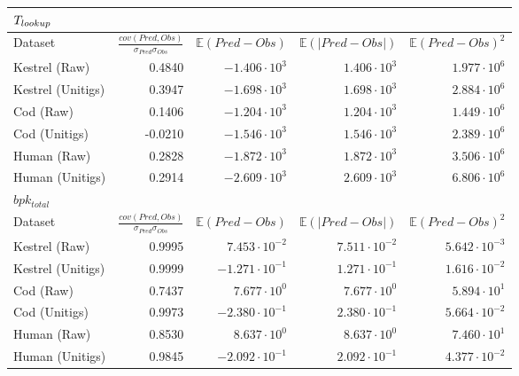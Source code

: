\begin{tabular}{lrrrr}
\toprule
\textbf{$T_{lookup_{}}$} & & & & \\
\midrule
Dataset & $\frac{cov(Pred,Obs)}{\sigma_{Pred} \sigma_{Obs}}$ & $\mathbb{E}(Pred-Obs)$ & $\mathbb{E}(|Pred-Obs|)$ & $\mathbb{E}(Pred-Obs)^2$ \\
\midrule
Kestrel (Raw) & 0.4840 & $-1.406 \cdot 10^{3}$ & $1.406 \cdot 10^{3}$ & $1.977 \cdot 10^{6}$ \\
Kestrel (Unitigs) & 0.3947 & $-1.698 \cdot 10^{3}$ & $1.698 \cdot 10^{3}$ & $2.884 \cdot 10^{6}$ \\
Cod (Raw) & 0.1406 & $-1.204 \cdot 10^{3}$ & $1.204 \cdot 10^{3}$ & $1.449 \cdot 10^{6}$ \\
Cod (Unitigs) & -0.0210 & $-1.546 \cdot 10^{3}$ & $1.546 \cdot 10^{3}$ & $2.389 \cdot 10^{6}$ \\
Human (Raw) & 0.2828 & $-1.872 \cdot 10^{3}$ & $1.872 \cdot 10^{3}$ & $3.506 \cdot 10^{6}$ \\
Human (Unitigs) & 0.2914 & $-2.609 \cdot 10^{3}$ & $2.609 \cdot 10^{3}$ & $6.806 \cdot 10^{6}$ \\
\midrule
\midrule
\textbf{$bpk_{total}$} & & & & \\
\midrule
Dataset & $\frac{cov(Pred,Obs)}{\sigma_{Pred} \sigma_{Obs}}$ & $\mathbb{E}(Pred-Obs)$ & $\mathbb{E}(|Pred-Obs|)$ & $\mathbb{E}(Pred-Obs)^2$ \\
\midrule
Kestrel (Raw) & 0.9995 & $7.453 \cdot 10^{-2}$ & $7.511 \cdot 10^{-2}$ & $5.642 \cdot 10^{-3}$ \\
Kestrel (Unitigs) & 0.9999 & $-1.271 \cdot 10^{-1}$ & $1.271 \cdot 10^{-1}$ & $1.616 \cdot 10^{-2}$ \\
Cod (Raw) & 0.7437 & $7.677 \cdot 10^{0}$ & $7.677 \cdot 10^{0}$ & $5.894 \cdot 10^{1}$ \\
Cod (Unitigs) & 0.9973 & $-2.380 \cdot 10^{-1}$ & $2.380 \cdot 10^{-1}$ & $5.664 \cdot 10^{-2}$ \\
Human (Raw) & 0.8530 & $8.637 \cdot 10^{0}$ & $8.637 \cdot 10^{0}$ & $7.460 \cdot 10^{1}$ \\
Human (Unitigs) & 0.9845 & $-2.092 \cdot 10^{-1}$ & $2.092 \cdot 10^{-1}$ & $4.377 \cdot 10^{-2}$ \\
\bottomrule
\end{tabular}
